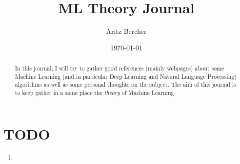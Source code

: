 \documentclass[11pt,a4paper]{article}
\title{ML Theory Journal}
\author{Aritz Bercher}
\date{\today}
\begin{document}
\maketitle

\begin{abstract}
In this journal, I will try to gather good references (mainly webpages) about some Machine Learning (and in particular Deep Learning and Natural Language Processing) algorithms as well as some personal thoughts on the subject. The aim of this journal is to keep gather in a same place the \textit{theory} of Machine Learning
\end{abstract}

\tableofcontents

\section{TODO}
\begin{enumerate}
\item 
\end{enumerate}
\end{document}
